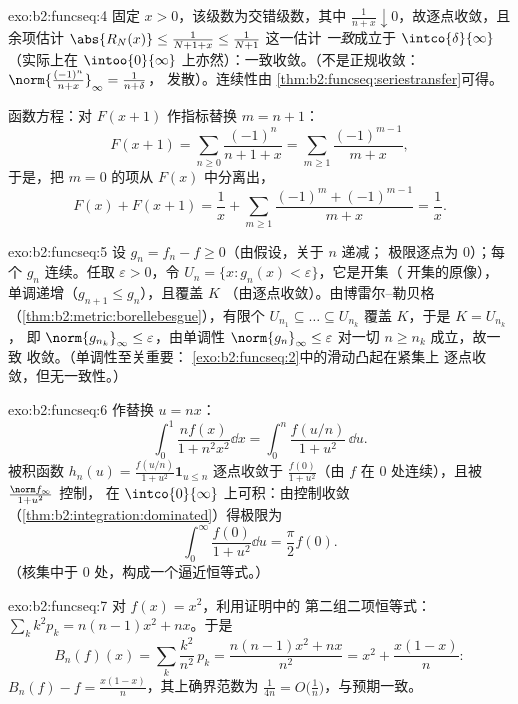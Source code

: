 \begin{solution}{exo:b2:funcseq:4}
固定 $x > 0$，该级数为交错级数，其中 $\frac{1}{n + x}
\downarrow 0$，故逐点收敛，且余项估计
$\abs{R_N(x)} \leq \frac{1}{N + 1 + x} \leq \frac{1}{N+1}$ 这一估计
\emph{一致}成立于 $\intco{\delta}{\infty}$（实际上在
$\intoo{0}{\infty}$ 上亦然）：一致收敛。（不是正规收敛：
$\norm{\frac{(-1)^n}{n+x}}_\infty = \frac{1}{n + \delta}$，
发散）。连续性由
\cref{thm:b2:funcseq:seriestransfer}可得。

函数方程：对 $F(x + 1)$ 作指标替换 $m = n + 1$：
\[
F(x+1) = \sum_{n\geq0} \frac{(-1)^n}{n + 1 + x}
= \sum_{m\geq1}\frac{(-1)^{m-1}}{m+x} ,
\]
于是，把 $m = 0$ 的项从 $F(x)$ 中分离出，
\[
F(x) + F(x+1)
= \frac{1}{x} + \sum_{m\geq1}
\frac{(-1)^m + (-1)^{m-1}}{m+x} = \frac1x .
\]
\end{solution}

\begin{solution}{exo:b2:funcseq:5}
设 $g_n = f_n - f \geq 0$（由假设，关于 $n$ 递减；
极限逐点为 $0$）；每个 $g_n$ 连续。任取 $\varepsilon
> 0$，令 $U_n = \{x : g_n(x) < \varepsilon\}$，它是开集（
开集的原像），单调递增（$g_{n+1} \leq g_n$），且覆盖 $K$
（由逐点收敛）。由博雷尔--勒贝格
（\cref{thm:b2:metric:borellebesgue}），有限个 $U_{n_1}
\subseteq \dots \subseteq U_{n_k}$ 覆盖 $K$，于是 $K = U_{n_k}$，
即 $\norm{g_{n_k}}_\infty \leq \varepsilon$，由单调性
$\norm{g_n}_\infty \leq \varepsilon$ 对一切 $n \geq n_k$ 成立，故一致
收敛。（单调性至关重要：
\cref{exo:b2:funcseq:2}中的滑动凸起在紧集上
逐点收敛，但无一致性。）
\end{solution}

\begin{solution}{exo:b2:funcseq:6}
作替换 $u = nx$：
\[
\int_0^1 \frac{n f(x)}{1 + n^2x^2}\dd x
= \int_0^n \frac{f(u/n)}{1 + u^2}\,\dd u .
\]
被积函数 $h_n(u) = \frac{f(u/n)}{1+u^2}\mathbf{1}_{u \leq n}$
逐点收敛于 $\frac{f(0)}{1+u^2}$（由 $f$ 在
$0$ 处连续），且被 $\frac{\norm f_\infty}{1 + u^2}$ 控制，
在 $\intco{0}{\infty}$ 上可积：由控制收敛
（\cref{thm:b2:integration:dominated}）得极限为
\[
\int_0^\infty \frac{f(0)}{1 + u^2}\dd u = \frac{\pi}{2} f(0) .
\]
（核集中于 $0$ 处，构成一个逼近恒等式。）
\end{solution}

\begin{solution}{exo:b2:funcseq:7}
对 $f(x) = x^2$，利用证明中的
第二组二项恒等式：$\sum_k k^2 p_k = n(n-1)x^2 + nx$。于是
\[
B_n(f)(x) = \sum_k \frac{k^2}{n^2}\,p_k
= \frac{n(n-1)x^2 + nx}{n^2}
= x^2 + \frac{x(1 - x)}{n} :
\]
$B_n(f) - f = \frac{x(1-x)}{n}$，其上确界范数为 $\frac{1}{4n} =
O\bigl(\frac1n\bigr)$，与预期一致。
\end{solution}

